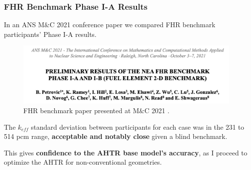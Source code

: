 \begin{frame}
    \frametitle{FHR Benchmark Phase I-A Results}
    In an ANS M$\&$C 2021 conference paper we compared FHR benchmark participants' 
    Phase I-A results. 
    \begin{figure}[]
        \centering
        \includegraphics[width=0.85\linewidth]{figures/mnc.png} 
        \caption{FHR benchmark paper presented at M$\&$C 2021 
        \cite{petrovic_preliminary_2021}.}
    \end{figure}

    The $k_{eff}$ standard deviation between participants for each case was in the 
    231 to 514 pcm range, \textbf{acceptable and notably close} given a blind benchmark.

    \vspace{0.2cm}
    This gives \textbf{confidence to the AHTR base model's accuracy}, as I 
    proceed to optimize the AHTR for non-conventional geometries. 
\end{frame}
